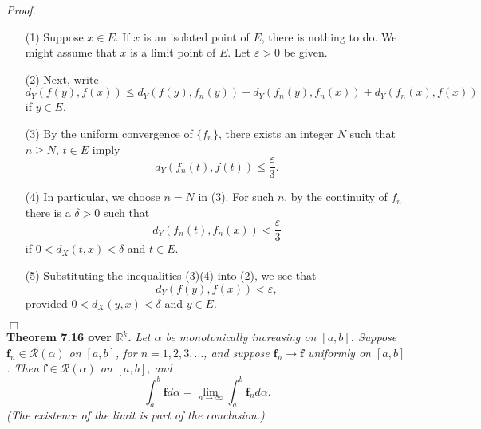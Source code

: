\documentclass{article}
\begin{document}
\emph{Proof.}
\begin{enumerate}
\item[(1)]
  Suppose $x \in E$.
  If $x$ is an isolated point of $E$, there is nothing to do.
  We might assume that $x$ is a limit point of $E$.
  Let $\varepsilon > 0$ be given.

\item[(2)]
  Next, write
  \[
    d_Y(f(y),f(x))
    \leq
    d_Y(f(y),f_n(y)) + d_Y(f_n(y),f_n(x)) + d_Y(f_n(x),f(x))
  \]
  if $y \in E$.

\item[(3)]
  By the uniform convergence of $\{f_n\}$, there exists an integer $N$
  such that $n \geq N$, $t \in E$ imply
  \[
    d_Y(f_n(t),f(t)) \leq \frac{\varepsilon}{3}.
  \]

\item[(4)]
  In particular, we choose $n = N$ in (3).
  For such $n$, by the continuity of $f_n$
  there is a $\delta > 0$ such that
  \[
    d_Y(f_n(t),f_n(x)) < \frac{\varepsilon}{3}
  \]
  if $0 < d_X(t,x) < \delta$ and $t \in E$.

\item[(5)]
  Substituting the inequalities (3)(4) into (2), we see that
  \[
    d_Y(f(y),f(x)) < \varepsilon,
  \]
  provided $0 < d_X(y,x) < \delta$ and $y \in E$.
\end{enumerate}
$\Box$ \\



\textbf{Theorem 7.16 over $\mathbb{R}^k$.}
\emph{Let $\alpha$ be monotonically increasing on $[a,b]$.
Suppose $\mathbf{f}_n \in \mathscr{R}(\alpha)$ on $[a,b]$,
for $n = 1,2,3,\ldots$,
and suppose $\mathbf{f}_n \to \mathbf{f}$ uniformly on $[a,b]$.
Then $\mathbf{f} \in \mathscr{R}(\alpha)$ on $[a,b]$,
and
\[
  \int_{a}^{b} \mathbf{f} d\alpha
  = \lim_{n \to \infty} \int_{a}^{b} \mathbf{f}_n d\alpha.
\]
(The existence of the limit is part of the conclusion.)} \\
\end{document}
